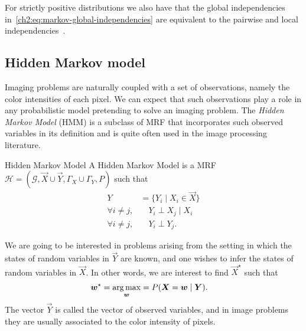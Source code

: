 For strictly positive distributions we also have that the global independencies in~\cref{ch2:eq:markov-global-independencies} are equivalent to the pairwise and local independencies~\cite{koller09}.

\subsection{Hidden Markov model}

Imaging problems are naturally coupled with a set of observations, namely the color intensities of each pixel. We can expect that such observations play a role in any probabilistic model pretending to solve an imaging problem. The \emph{Hidden Markov Model} (HMM) is a subclass of MRF that incorporates such observed variables in its definition and is quite often used in the image processing literature.

\begin{definition}{Hidden Markov Model}
A Hidden Markov Model is a MRF $\mathcal{H} = (\mathcal{G},\vec{X} \cup \vec{Y}, \Gamma_X \cup \Gamma_Y,P)$ such that
\begin{align*}
	Y &= \{ Y_i \; | \; X_i \in \vec{X} \} \\
	\forall i \neq j,& \quad Y_i \perp X_j \; | \; X_i \\
	\forall i \neq j,& \quad Y_i \perp Y_j	.
\end{align*}
\end{definition}
%
We are going to be interested in problems arising from the setting in which the states of random variables in $\vec{Y}$ are known, and one wishes to infer the states of random variables in $\vec{X}$. In other words, we are interest to find $\vec{X}^{\star}$ such that
\begin{align}
	\bm{w}^{\star} &= \operatorname*{arg\,max}_{\bm{w}} = P(\bm{X} = \bm{w} \; | \; \bm{Y}).
	\label{ch2:eq:general-maximum-likelihood}
\end{align}
%
The vector $\vec{Y}$ is called the vector of observed variables, and in image problems they are usually associated to the color intensity of pixels. 

